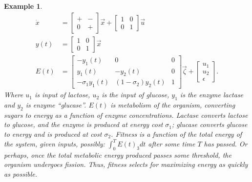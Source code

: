 \documentclass[11 pt]{article}
\newtheorem{example}{Example}
\begin{document}
  \begin{example}
  \begin{align*}
    \dot{x} &= \begin{bmatrix} + & - \\ 0 & + \end{bmatrix} \vec{x} + \begin{bmatrix} 1 & 0 \\ 0 & 1 \end{bmatrix} \vec{u} \\
      y(t) &= \begin{bmatrix} 1 & 0 \\ 0 & 1 \end{bmatrix} \vec{x} \\
        E(t) &= \begin{bmatrix} -y_{1}(t) & 0 & 0 \\ y_{1}(t) & -y_{2}(t) & 0 \\ -\sigma_{1} y_{1}(t) & (1 - \sigma_{2})y_{2}(t) & 1 \end{bmatrix} \vec{\zeta} + \begin{bmatrix} u_{1} \\ u_{2} \\ \epsilon \end{bmatrix} .
  \end{align*}
    Where $u_{1}$ is input of \emph{lactose}, $u_{2}$ is the input of \emph{glucose}, $y_{1}$ is the enzyme \emph{lactase} and $y_{2}$ is enzyme \emph{``glucase''}. $E(t)$ is metabolism of the organism, converting sugars to energy as a function of enzyme concentrations. Lactase converts lactose to glucose, and the enzyme is produced at energy cost $\sigma_{1}$; glucase converts glucose to energy and is produced at cost $\sigma_{2}$. Fitness is a function of the total energy of the system, given inputs, possibly: $\int_{0}^{T}E(t)_{3} dt$ after some time $T$ has passed. Or perhaps, once the total metabolic energy produced passes some threshold, the organism undergoes fission. Thus, fitness selects for maximizing energy as quickly as possible. 
  \end{example}
\end{document}
